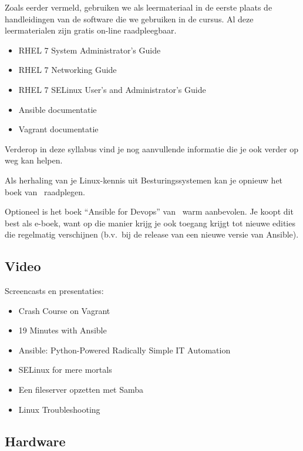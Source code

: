 Zoals eerder vermeld, gebruiken we als leermateriaal in de eerste plaats de handleidingen van de software die we gebruiken in de cursus. Al deze leermaterialen zijn gratis on-line raadpleegbaar.

\begin{itemize}
  \item RHEL 7 System Administrator's Guide~\autocite{SvistunovEtAl2016}
  \item RHEL 7 Networking Guide~\autocite{JahodaEtAl2016}
  \item RHEL 7 SELinux User's and Administrator's Guide~\autocite{JahodaEtAl2016a}
  \item Ansible documentatie~\autocite{Ansible2016}
  \item Vagrant documentatie~\autocite{Hashicorp}
\end{itemize}

Verderop in deze syllabus vind je nog aanvullende informatie die je ook verder op weg kan helpen.

Als herhaling van je Linux-kennis uit Besturingssystemen kan je opnieuw het boek van~\textcite{Cobbaut2015} raadplegen.

Optioneel is het boek ``Ansible for Devops'' van~\textcite{Geerling2016} warm aanbevolen. Je koopt dit best als e-boek, want op die manier krijg je ook toegang krijgt tot nieuwe edities die regelmatig verschijnen (b.v.~bij de release van een nieuwe versie van Ansible).

\subsection{Video}%
\label{ssec:video}

Screencasts en presentaties:

\begin{itemize}
  \item Crash Course on Vagrant~\autocite{Weissig2014}
  \item 19 Minutes with Ansible~\autocite{Weissig2015}
  \item Ansible: Python-Powered Radically Simple IT Automation~\autocite{DeHaan2014}
  \item SELinux for mere mortals~\autocite{Cameron2012}
  \item Een fileserver opzetten met Samba~\autocite{VanVreckem2014}
  \item Linux Troubleshooting~\autocite{VanVreckem2015b}
\end{itemize}

\subsection{Hardware}%
\label{ssec:hardware}


